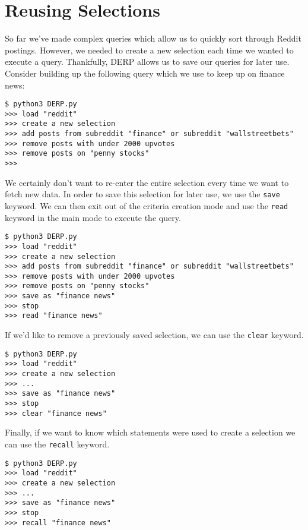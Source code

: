\section{Reusing Selections}
So far we’ve made complex queries which allow us to quickly sort through Reddit postings.
However, we needed to create a new selection each time we wanted to execute a query.
Thankfully, DERP allows us to save our queries for later use. Consider building up the
following query which we use to keep up on finance news:
\newline\begin{minipage}{\linewidth}\begin{lstlisting}
$ python3 DERP.py
>>> load "reddit"
>>> create a new selection
>>> add posts from subreddit "finance" or subreddit "wallstreetbets"
>>> remove posts with under 2000 upvotes
>>> remove posts on "penny stocks"
>>>
\end{lstlisting}\end{minipage}
We certainly don’t want to re-enter the entire selection every time we want to fetch new data.
In order to save this selection for later use, we use the \texttt{save} keyword. We can then exit out of
the criteria creation mode and use the \texttt{read} keyword in the main mode to execute the query.
\newline\begin{minipage}{\linewidth}\begin{lstlisting}
$ python3 DERP.py
>>> load "reddit"
>>> create a new selection
>>> add posts from subreddit "finance" or subreddit "wallstreetbets"
>>> remove posts with under 2000 upvotes
>>> remove posts on "penny stocks"
>>> save as "finance news"
>>> stop
>>> read "finance news"
\end{lstlisting}\end{minipage}
If we’d like to remove a previously saved selection, we can use the \texttt{clear} keyword.
\newline\begin{minipage}{\linewidth}\begin{lstlisting}
$ python3 DERP.py
>>> load "reddit"
>>> create a new selection
>>> ...
>>> save as "finance news"
>>> stop
>>> clear "finance news"
\end{lstlisting}\end{minipage}
Finally, if we want to know which statements were used to create a selection we can use the \texttt{recall} keyword.
\newline\begin{minipage}{\linewidth}\begin{lstlisting}
$ python3 DERP.py
>>> load "reddit"
>>> create a new selection
>>> ...
>>> save as "finance news"
>>> stop
>>> recall "finance news"
\end{lstlisting}\end{minipage}
